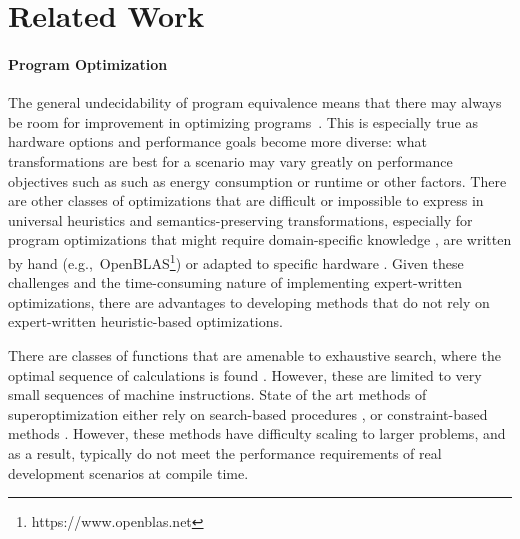 \documentclass{article}
\begin{document}
\section{Related Work}


\paragraph{Program Optimization}

The general undecidability of program equivalence means that there may always be room for improvement in optimizing programs~\citep{rice1953}. This is especially true as hardware options and performance goals become more diverse: what transformations are best for a scenario may vary greatly on performance objectives such as such as energy consumption or runtime or other factors. There are other classes of optimizations that are difficult or impossible to express in universal heuristics and semantics-preserving transformations, especially for program optimizations that might require domain-specific knowledge \citep{rinard2006}, are written by hand (e.g.,~OpenBLAS\footnote{https://www.openblas.net}) or adapted to specific hardware \citep{fftw}. Given these challenges and the time-consuming nature of implementing expert-written optimizations, there are advantages to developing methods that do not rely on expert-written heuristic-based optimizations. 

There are classes of functions that are amenable to exhaustive search, where the optimal sequence of calculations is found \citep{massalin1987superoptimizer}. However, these are limited to very small sequences of machine instructions. State of the art methods of superoptimization either rely on search-based procedures \citep{schkufza2013stochastic}, or constraint-based methods \citep{sasnauskas2017}. However, these methods have difficulty scaling to larger problems, and as a result, typically do not meet the performance requirements of real development scenarios at compile time.
\end{document}
